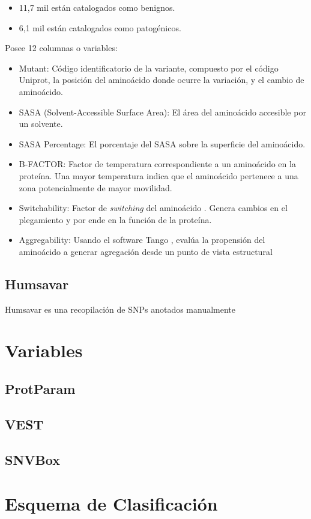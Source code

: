 \begin{itemize}
    \item 11,7 mil están catalogados como benignos.
    \item 6,1 mil están catalogados como patogénicos.
\end{itemize}

Posee 12 columnas o variables: 

\begin{itemize}
    \item Mutant: Código identificatorio de la variante, compuesto por el código Uniprot, la posición del aminoácido donde ocurre la variación, y el cambio de aminoácido.
    \item SASA (Solvent-Accessible Surface Area): El área del aminoácido accesible por un solvente.
    \item SASA Percentage: El porcentaje del SASA sobre la superficie del aminoácido.
    \item B-FACTOR: Factor de temperatura correspondiente a un aminoácido en la proteína. Una mayor temperatura indica que el aminoácido pertenece a una zona potencialmente de mayor movilidad.
    \item Switchability: Factor de \textit{switching} del aminoácido \cite{Diaz2014}. Genera cambios en el plegamiento y por ende en la función de la proteína. 
    \item Aggregability: Usando el software Tango \cite{Fernandez-Escamilla2004}, evalúa la propensión del aminoácido a generar agregación desde un punto de vista estructural
    
\end{itemize}

\subsection{Humsavar}

Humsavar es una recopilación de SNPs anotados manualmente 


\section{Variables}

\subsection{ProtParam}

\subsection{VEST}

\subsection{SNVBox}


\section{Esquema de Clasificación}